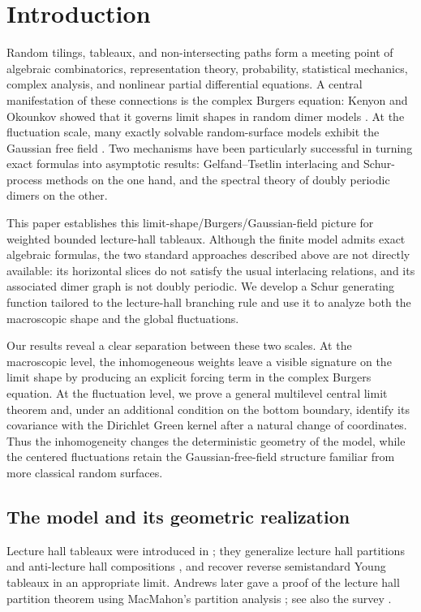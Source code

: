 \documentclass[11pt]{amsart}
\newenvironment{introrevision}{\begingroup\color{black}}{\endgroup}
\theoremstyle{plain}
\numberwithin{equation}{section}
\numberwithin{theorem}{section}
\numberwithin{figure}{section}
\begin{document}
\section{Introduction} 

\begin{introrevision}
Random tilings, tableaux, and non-intersecting paths form a meeting
point of algebraic combinatorics, representation theory, probability,
statistical mechanics, complex analysis, and nonlinear partial
differential equations. A central manifestation of these connections
is the complex Burgers equation: Kenyon and Okounkov showed that it
governs limit shapes in random dimer models \cite{ko07}. At the
fluctuation scale, many exactly solvable random-surface models exhibit
the Gaussian free field \cite{RK01,Li13,bg16}. Two mechanisms have
been particularly successful in turning exact formulas into
asymptotic results: Gelfand--Tsetlin interlacing and Schur-process
methods on the one hand, and the spectral theory of doubly periodic
dimers on the other.

This paper establishes this limit-shape/Burgers/Gaussian-field picture
for weighted bounded lecture-hall tableaux. Although the finite model
admits exact algebraic formulas, the two standard approaches described
above are not directly available: its horizontal slices do not satisfy
the usual interlacing relations, and its associated dimer graph is not
doubly periodic. We develop a Schur generating function tailored to
the lecture-hall branching rule and use it to analyze both the
macroscopic shape and the global fluctuations.

Our results reveal a clear separation between these two scales. At
the macroscopic level, the inhomogeneous weights leave a visible
signature on the limit shape by producing an explicit forcing term in
the complex Burgers equation. At the fluctuation level, we prove a
general multilevel central limit theorem and, under an additional
condition on the bottom boundary, identify its covariance with the
Dirichlet Green kernel after a natural change of coordinates. Thus the
inhomogeneity changes the deterministic geometry of the model, while
the centered fluctuations retain the Gaussian-free-field structure
familiar from more classical random surfaces.

\subsection*{The model and its geometric realization}


Lecture hall tableaux were introduced in \cite{SK20}; they generalize
lecture hall partitions \cite{BE971,BE972} and anti-lecture hall
compositions \cite{SC03}, and recover reverse semistandard Young
tableaux in an appropriate limit. Andrews later gave a proof of the
lecture hall partition theorem using MacMahon's partition analysis
\cite{Andrews98LHP}; see also the survey \cite{SA16}.
\end{introrevision}
\end{document}
